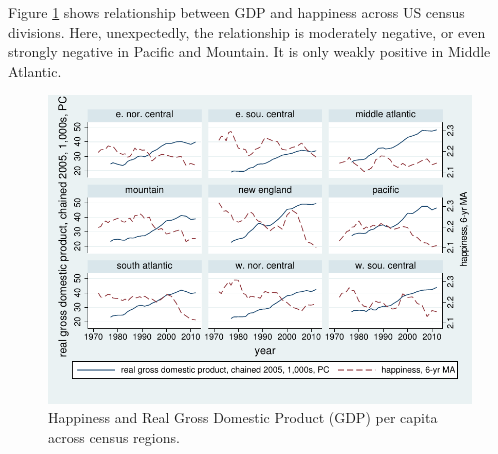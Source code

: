 \documentclass[10pt, letterpaper]{article}
\begin{document}
\begin{spacing}{1.5}
Figure \ref{GDP-SWB} shows relationship between GDP and happiness across US census divisions.
Here, unexpectedly, the relationship is moderately negative, or even strongly
negative in Pacific and Mountain. It is only weakly positive in Middle
Atlantic. %

\begin{figure}[H]
 \includegraphics[width=7in]{GDP-SWB-INKSCAPE.pdf}\centering \caption{Happiness
   and Real Gross Domestic  Product (GDP) per capita  across  census regions.}\label{GDP-SWB} 
\end{figure}









% 




\end{spacing}
\end{document}
